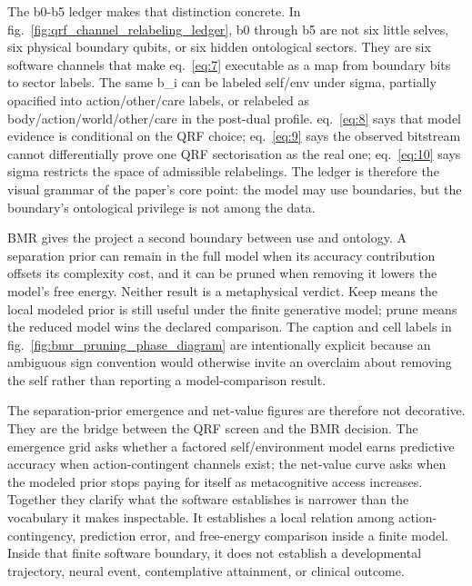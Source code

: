 \documentclass[
]{article}
\begin{document}
The b0-b5 ledger makes that distinction concrete. In
fig.~\ref{fig:qrf_channel_relabeling_ledger}, b0 through b5 are not six
little selves, six physical boundary qubits, or six hidden ontological
sectors. They are six software channels that make eq.~\ref{eq:7}
executable as a map from boundary bits to sector labels. The same b\_i
can be labeled self/env under sigma, partially opacified into
action/other/care labels, or relabeled as body/action/world/other/care
in the post-dual profile. eq.~\ref{eq:8} says that model evidence is
conditional on the QRF choice; eq.~\ref{eq:9} says the observed
bitstream cannot differentially prove one QRF sectorisation as the real
one; eq.~\ref{eq:10} says sigma restricts the space of admissible
relabelings. The ledger is therefore the visual grammar of the paper's
core point: the model may use boundaries, but the boundary's ontological
privilege is not among the data.

BMR gives the project a second boundary between use and ontology. A
separation prior can remain in the full model when its accuracy
contribution offsets its complexity cost, and it can be pruned when
removing it lowers the model's free energy. Neither result is a
metaphysical verdict. Keep means the local modeled prior is still useful
under the finite generative model; prune means the reduced model wins
the declared comparison. The caption and cell labels in
fig.~\ref{fig:bmr_pruning_phase_diagram} are intentionally explicit
because an ambiguous sign convention would otherwise invite an overclaim
about removing the self rather than reporting a model-comparison result.

The separation-prior emergence and net-value figures are therefore not
decorative. They are the bridge between the QRF screen and the BMR
decision. The emergence grid asks whether a factored self/environment
model earns predictive accuracy when action-contingent channels exist;
the net-value curve asks when the modeled prior stops paying for itself
as metacognitive access increases. Together they clarify what the
software establishes is narrower than the vocabulary it makes
inspectable. It establishes a local relation among action-contingency,
prediction error, and free-energy comparison inside a finite model.
Inside that finite software boundary, it does not establish a
developmental trajectory, neural event, contemplative attainment, or
clinical outcome.
\end{document}
